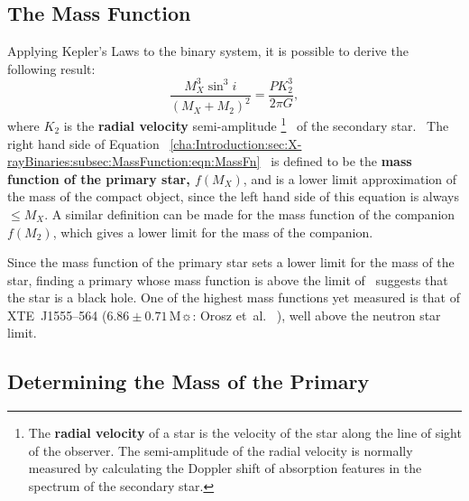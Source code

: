 
\subsection{The Mass Function}\label{cha:Introduction:sec:X-rayBinaries:subsec:MassFunction}

Applying Kepler's Laws to the binary system, it is possible to derive the following result:
\begin{equation}\label{cha:Introduction:sec:X-rayBinaries:subsec:MassFunction:eqn:MassFn}
\frac{M_X^3 \sin^3{i}}{(M_X+M_2)^2} = \frac{P K_2^3}{2 \pi G},%
\end{equation}
where $K_2$ is the \textbf{radial velocity} semi-amplitude%
\footnote{\label{cha:Introduction:sec:X-rayBinaries:subsec:MassFunction:foot:radial}%
The \textbf{radial velocity} of a star is the velocity of the star along the line of sight of
the observer. The semi-amplitude of the radial velocity is normally
measured by calculating the Doppler shift of absorption features in
the spectrum of the secondary star. %
}%
\  of the secondary star.%
\ The right hand side of Equation~%
\ref{cha:Introduction:sec:X-rayBinaries:subsec:MassFunction:eqn:MassFn}%
\ is defined to be the \textbf{mass function of the primary star,
  $f(M_X)$}, and is a lower limit approximation of the mass of the
compact object, since the left hand side of this equation is always $\leq M_X$. A
similar definition can be made for the mass function of the companion $f(M_2)$,
which gives a lower limit for the mass of the companion. %

\vspace{\myparskip}

Since the mass function of the primary
star sets a lower limit for the mass of the star, finding a primary
whose mass function is above the limit of %
%
\ suggests that the star is a black hole. One of the
highest mass functions yet measured is that of \mbox{XTE J1555--564}
($6.86\pm0.71\,\mathrm{M}\sun$: Orosz et~al.\ %
), well above the neutron star limit. %


\subsection{Determining the Mass of the Primary}\label{cha:Introduction:sec:X-rayBinaries:subsec:DeterminingTheMassOfThePrimary}

